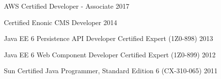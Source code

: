 

\begin{cvskills}

  \cvskill
    {AWS Certified Developer - Associate} %
    {2017} %

  \cvskill
    {Certified Enonic CMS Developer} %
    {2014} %

  \cvskill
    {Java EE 6 Persistence API Developer Certified Expert (1Z0-898)} %
    {2013} %

  \cvskill
    {Java EE 6 Web Component Developer Certified Expert (1Z0-899)} %
    {2012} %

  \cvskill
    {Sun Certified Java Programmer, Standard Edition 6 (CX-310-065)} %
    {2011} %

\end{cvskills}
